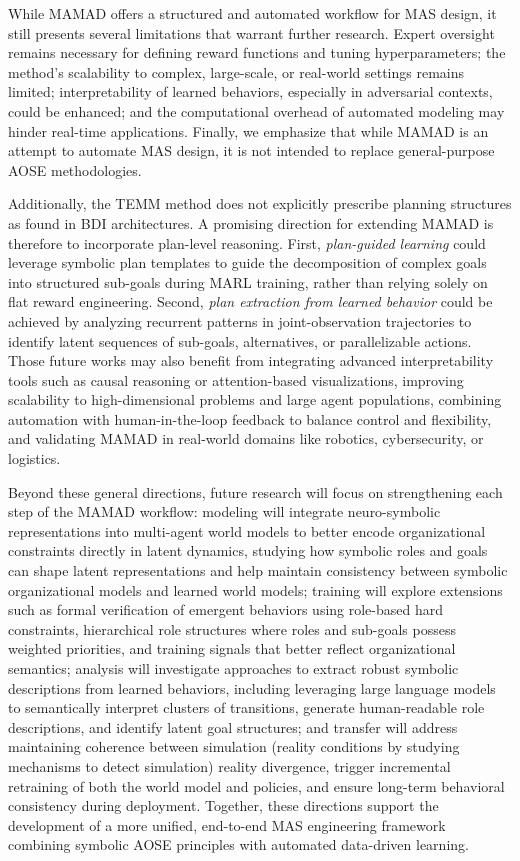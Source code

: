 \documentclass[pdflatex,sn-mathphys-num]{sn-jnl}%
\theoremstyle{thmstyleone}%
\theoremstyle{thmstyletwo}%
\theoremstyle{thmstylethree}%
\begin{document}
While MAMAD offers a structured and automated workflow for MAS design, it still presents several limitations that warrant further research. Expert oversight remains necessary for defining reward functions and tuning hyperparameters; the method's scalability to complex, large-scale, or real-world settings remains limited; interpretability of learned behaviors, especially in adversarial contexts, could be enhanced; and the computational overhead of automated modeling may hinder real-time applications. Finally, we emphasize that while MAMAD is an attempt to automate MAS design, it is not intended to replace general-purpose AOSE methodologies.

Additionally, the TEMM method does not explicitly prescribe planning structures as found in BDI architectures. A promising direction for extending MAMAD is therefore to incorporate plan-level reasoning. First, \textit{plan-guided learning} could leverage symbolic plan templates to guide the decomposition of complex goals into structured sub-goals during MARL training, rather than relying solely on flat reward engineering. Second, \textit{plan extraction from learned behavior} could be achieved by analyzing recurrent patterns in joint-observation trajectories to identify latent sequences of sub-goals, alternatives, or parallelizable actions.
Those future works may also benefit from integrating advanced interpretability tools such as causal reasoning or attention-based visualizations, improving scalability to high-dimensional problems and large agent populations, combining automation with human-in-the-loop feedback to balance control and flexibility, and validating MAMAD in real-world domains like robotics, cybersecurity, or logistics.

Beyond these general directions, future research will focus on strengthening each step of the MAMAD workflow: modeling will integrate neuro-symbolic representations into multi-agent world models to better encode organizational constraints directly in latent dynamics, studying how symbolic roles and goals can shape latent representations and help maintain consistency between symbolic organizational models and learned world models; training will explore extensions such as formal verification of emergent behaviors using role-based hard constraints, hierarchical role structures where roles and sub-goals possess weighted priorities, and training signals that better reflect organizational semantics; analysis will investigate approaches to extract robust symbolic descriptions from learned behaviors, including leveraging large language models to semantically interpret clusters of transitions, generate human-readable role descriptions, and identify latent goal structures; and transfer will address maintaining coherence between simulation (reality conditions by studying mechanisms to detect simulation) reality divergence, trigger incremental retraining of both the world model and policies, and ensure long-term behavioral consistency during deployment. Together, these directions support the development of a more unified, end-to-end MAS engineering framework combining symbolic AOSE principles with automated data-driven learning.
\end{document}
